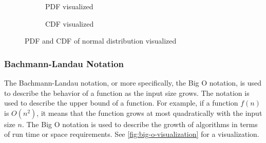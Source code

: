\begin{figure}[H]
  \begin{subfigure}[b]{0.4\textwidth}
    \centering
    \caption{\gls{PDF} visualized}
    \label{fig:pdf-theory}
  \end{subfigure}
  \hfill
  \begin{subfigure}[b]{0.4\textwidth}
    \centering
    \caption{\gls{CDF} visualized}
    \label{fig:cdf-theory}
  \end{subfigure}
  \caption{\gls{PDF} and \gls{CDF} of normal distribution visualized}
  \label{fig:probability-theory}
\end{figure}

\subsubsection{Bachmann-Landau Notation}

The Bachmann-Landau notation, or more specifically, the Big O notation, is used to describe the behavior of a function as the input size grows. The notation is used to describe the upper bound of a function. For example, if a function $f(n)$ is $O(n^2)$, it means that the function grows at most quadratically with the input size $n$. The Big O notation is used to describe the growth of algorithms in terms of run time or space requirements. See \autoref{fig:big-o-visualization} for a visualization.

